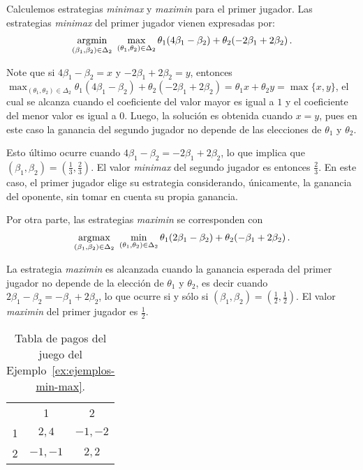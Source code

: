 Calculemos estrategias \textit{minimax} y \textit{maximin} para el primer jugador. Las estrategias \textit{minimax} del primer jugador vienen expresadas por:
\begin{alignat}{1}
\operatorname*{\arg\!\min}_{(\beta_1, \beta_2) \in \Delta_2 }\ {\max_{(\theta_1, \theta_2) \in \Delta_2}
{\theta_1(4\beta_1 -\beta_2) + \theta_2(-2\beta_1 + 2\beta_2)}} \,.
\end{alignat}

Note que si $4\beta_1 - \beta_2 = x$ y $-2 \beta_1 + 2\beta_2 = y$, entonces $\max_{(\theta_1, \theta_2) \in \Delta_2} \theta_1(4\beta_1 -\beta_2) + \theta_2(-2\beta_1 + 2\beta_2) = \theta_1 x + \theta_2 y = \max\{x, y\}$, el cual se alcanza cuando el coeficiente del valor mayor es igual a $1$ y el coeficiente del menor valor es igual a $0$. Luego, la solución es obtenida cuando $x = y$, pues en este caso la ganancia del segundo jugador no depende de las elecciones de $\theta_1$ y $\theta_2$.

Esto último ocurre cuando $4\beta_1 - \beta_2 = -2\beta_1 + 2\beta_2$, lo que implica que $(\beta_1, \beta_2) = \left(\frac{1}{3}, \frac{2}{3} \right)$.  El valor \textit{minimax} del segundo jugador es entonces $\frac{2}{3}$. En este caso, el primer jugador elige su estrategia considerando, únicamente, la ganancia del oponente, sin tomar en cuenta su propia ganancia.

Por otra parte, las estrategias \textit{maximin} se corresponden con
\begin{alignat}{1}
\operatorname*{\arg\!\max}_{(\beta_1, \beta_2) \in \Delta_2 }\ {\min_{(\theta_1, \theta_2) \in \Delta_2}
{\theta_1(2\beta_1 -\beta_2) + \theta_2(-\beta_1 + 2\beta_2)}} \,.
\end{alignat}

La estrategia \textit{maximin} es alcanzada cuando la ganancia esperada del primer jugador no depende de la elección de $\theta_1$ y $\theta_2$, es decir cuando $2\beta_1 - \beta_2 = -\beta_1 + 2\beta_2$, lo que ocurre si y sólo si $(\beta_1, \beta_2) = \left(\frac{1}{2}, \frac{1}{2}\right)$. El valor \textit{maximin} del primer jugador es $\frac{1}{2}$.

\begin{table}[t]
\begin{center}
\caption{Tabla de pagos del juego del Ejemplo~\ref{ex:ejemplos-min-max}.}
\label{table:ejemplos-min-max}
\begin{tabular}{ r | c | c |}
 \multicolumn{1}{c}{} & \multicolumn{1}{c}{1} & \multicolumn{1}{c}{2}  \\ \cline{2-3}
 1 & $2, 4$ & $-1, -2$ \\ \cline{2-3}
 2 & $-1, -1$ & $2, 2$ \\ \cline{2-3}
\end{tabular}
\end{center}
\end{table}

